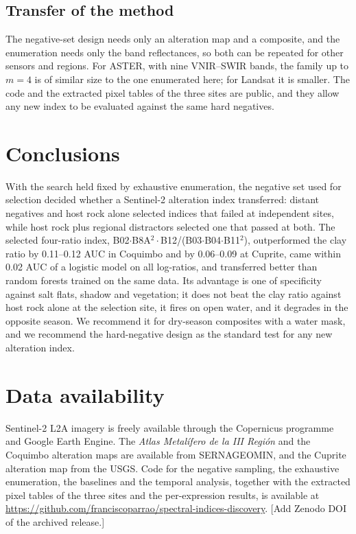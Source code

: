 \documentclass[preprint,authoryear,number]{elsarticle}
\begin{document}
\subsection{Transfer of the method}

The negative-set design needs only an alteration map and a composite, and the enumeration needs only the band reflectances, so both can be repeated for other sensors and regions. For ASTER, with nine VNIR--SWIR bands, the family up to $m = 4$ is of similar size to the one enumerated here; for Landsat it is smaller. The code and the extracted pixel tables of the three sites are public, and they allow any new index to be evaluated against the same hard negatives.

\section{Conclusions}
\label{sec:conclusions}

With the search held fixed by exhaustive enumeration, the negative set used for selection decided whether a Sentinel-2 alteration index transferred: distant negatives and host rock alone selected indices that failed at independent sites, while host rock plus regional distractors selected one that passed at both. The selected four-ratio index, B02$\cdot$B8A$^2\cdot$B12/(B03$\cdot$B04$\cdot$B11$^2$), outperformed the clay ratio by 0.11--0.12 AUC in Coquimbo and by 0.06--0.09 at Cuprite, came within 0.02 AUC of a logistic model on all log-ratios, and transferred better than random forests trained on the same data. Its advantage is one of specificity against salt flats, shadow and vegetation; it does not beat the clay ratio against host rock alone at the selection site, it fires on open water, and it degrades in the opposite season. We recommend it for dry-season composites with a water mask, and we recommend the hard-negative design as the standard test for any new alteration index.

\section*{Data availability}

Sentinel-2 L2A imagery is freely available through the Copernicus programme and Google Earth Engine. The \emph{Atlas Metal\'ifero de la III Regi\'on} and the Coquimbo alteration maps are available from SERNAGEOMIN, and the Cuprite alteration map from the USGS. Code for the negative sampling, the exhaustive enumeration, the baselines and the temporal analysis, together with the extracted pixel tables of the three sites and the per-expression results, is available at \url{https://github.com/franciscoparrao/spectral-indices-discovery}. [Add Zenodo DOI of the archived release.]
\end{document}
